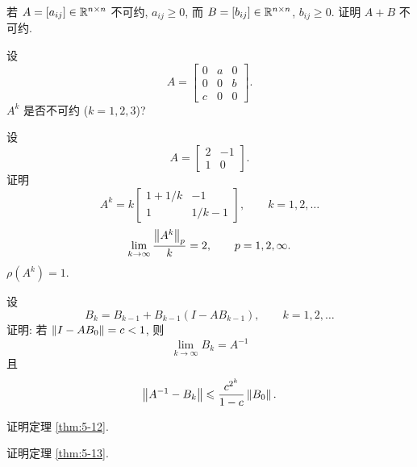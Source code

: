 \begin{exercises}
  \item 若 $A=[a_{ij}]\in\mathbb{R}^{n\times n}$ 不可约, $a_{ij}\geqslant0$, 而 $B=[b_{ij}]\in\mathbb{R}^{n\times n}$, $b_{ij}\geqslant0$. 证明 $A+B$ 不可约.

  \item 设
  \[
    A=
    \begin{bmatrix}
      0 & a & 0\\
      0 & 0 & b\\
      c & 0 & 0
    \end{bmatrix}.
  \]
  $A^k$ 是否不可约 ($k=1,2,3$)?

  \item 设
  \[
    A=
    \begin{bmatrix}
      2 & -1\\
      1 & 0
    \end{bmatrix}.
  \]
  证明
  \subquest
  \[
    A^k=k
    \begin{bmatrix}
      1+1/k & -1\\
      1 & 1/k-1
    \end{bmatrix},
    \qquad k=1,2,\ldots
  \]
  \subquest
  \[
    \lim_{k\to\infty}\frac{\left\|A^k\right\|_p}{k}=2,
    \qquad p=1,2,\infty.
  \]
  \subquest $\rho(A^k)=1$.

  \item 设
  \[
    B_k=B_{k-1}+B_{k-1}(I-AB_{k-1}),\qquad k=1,2,\ldots
  \]
  证明: 若 $\left\|I-AB_0\right\|=c<1$, 则
  \[
    \lim_{k\to\infty}B_k=A^{-1}
  \]
  且
  \[
    \left\|A^{-1}-B_k\right\|\leqslant\frac{c^{2^k}}{1-c}\left\|B_0\right\|.
  \]

  \item 证明定理 \ref{thm:5-12}.

  \item 证明定理 \ref{thm:5-13}.
\end{exercises}
